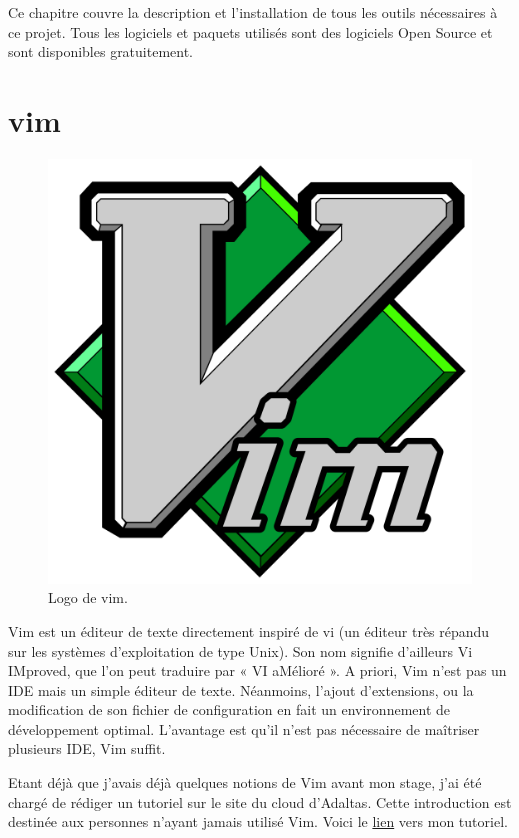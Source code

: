 \documentclass[12pt, french]{report}
\begin{document}
Ce chapitre couvre la description et l'installation de tous les outils nécessaires à ce projet. Tous les logiciels et paquets utilisés sont des logiciels Open Source et sont disponibles gratuitement.

\section{vim}

\begin{figure}[H]
\includegraphics[scale=0.1]{assets/img/logo-vim.png}
\centering
\caption{Logo de vim.}
\label{fig:logo-adaltas}
\end{figure}

Vim est un éditeur de texte directement inspiré de vi (un éditeur très répandu sur les systèmes d’exploitation de type Unix). Son nom signifie d’ailleurs Vi IMproved, que l’on peut traduire par « VI aMélioré ». A priori, Vim n'est pas un IDE mais un simple éditeur de texte. Néanmoins, l'ajout  d'extensions, ou la modification de son fichier de configuration en fait un environnement de développement optimal. L'avantage est qu'il n'est pas nécessaire de maîtriser plusieurs IDE, Vim suffit.

Etant déjà que j'avais déjà quelques notions de Vim avant mon stage, j'ai été chargé de rédiger un tutoriel sur le site du cloud d'Adaltas. Cette introduction est destinée aux personnes n'ayant jamais utilisé Vim. Voici le \href{https://www.adaltas.cloud/en/docs/foundations/vim/}{lien} vers mon tutoriel.
\end{document}
